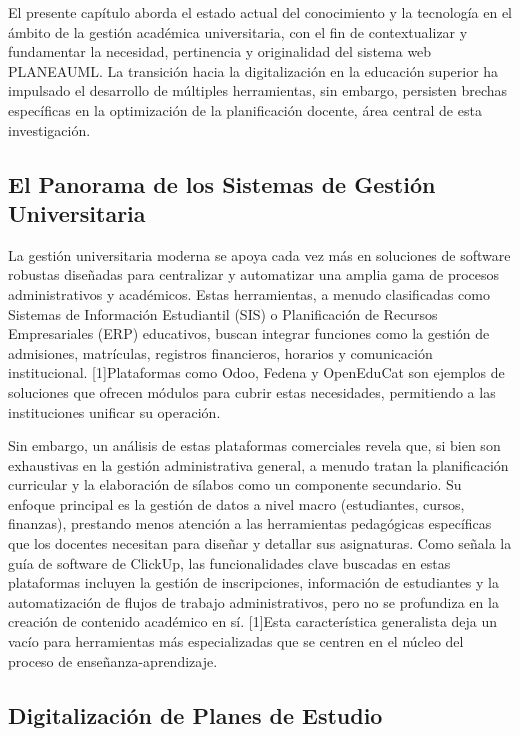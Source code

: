 
El presente capítulo aborda el estado actual del conocimiento y la tecnología en el ámbito de la gestión académica universitaria, con el fin de contextualizar y fundamentar la necesidad, pertinencia y originalidad del sistema web PLANEAUML. La transición hacia la digitalización en la educación superior ha impulsado el desarrollo de múltiples herramientas, sin embargo, persisten brechas específicas en la optimización de la planificación docente, área central de esta investigación.


\subsection{El Panorama de los Sistemas de Gestión Universitaria}

La gestión universitaria moderna se apoya cada vez más en soluciones de software robustas diseñadas para centralizar y automatizar una amplia gama de procesos administrativos y académicos. Estas herramientas, a menudo clasificadas como Sistemas de Información Estudiantil (SIS) o Planificación de Recursos Empresariales (ERP) educativos, buscan integrar funciones como la gestión de admisiones, matrículas, registros financieros, horarios y comunicación institucional. [1]Plataformas como Odoo, Fedena y OpenEduCat son ejemplos de soluciones que ofrecen módulos para cubrir estas necesidades, permitiendo a las instituciones unificar su operación.

Sin embargo, un análisis de estas plataformas comerciales revela que, si bien son exhaustivas en la gestión administrativa general, a menudo tratan la planificación curricular y la elaboración de sílabos como un componente secundario. Su enfoque principal es la gestión de datos a nivel macro (estudiantes, cursos, finanzas), prestando menos atención a las herramientas pedagógicas específicas que los docentes necesitan para diseñar y detallar sus asignaturas. Como señala la guía de software de ClickUp, las funcionalidades clave buscadas en estas plataformas incluyen la gestión de inscripciones, información de estudiantes y la automatización de flujos de trabajo administrativos, pero no se profundiza en la creación de contenido académico en sí. [1]Esta característica generalista deja un vacío para herramientas más especializadas que se centren en el núcleo del proceso de enseñanza-aprendizaje.

\subsection{Digitalización de Planes de Estudio}

